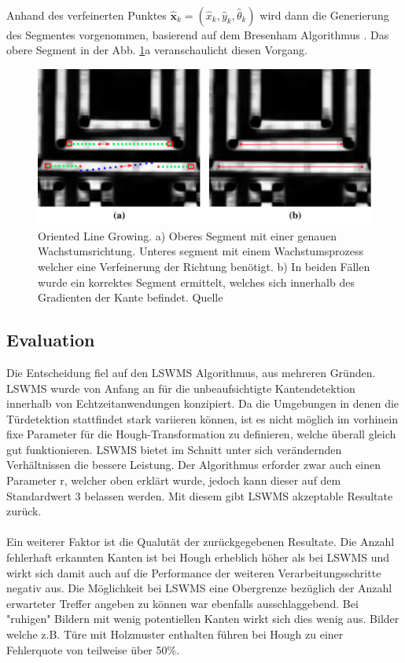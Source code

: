 \paragraph{}
Anhand des verfeinerten Punktes $\hat{\textbf{x}}_k = (\hat{x}_k, \hat{y}_k, \hat{\theta}_k)$ wird dann die Generierung des Segmentes vorgenommen, basierend auf dem Bresenham Algorithmus \cite{bresenham}. Das obere Segment in der Abb. \ref{fig:lswms-line-growing}a veranschaulicht diesen Vorgang.

\begin{figure}[!ht]
\centering
\includegraphics[width=\textwidth]{images/lswms-line-growing} 
\caption{Oriented Line Growing. a) Oberes Segment mit einer genauen Wachstumsrichtung. Unteres segment mit einem Wachstumsprozess welcher eine Verfeinerung der Richtung benötigt. b) In beiden Fällen wurde ein korrektes Segment ermittelt, welches sich innerhalb des Gradienten der Kante befindet. Quelle \cite{nieto}}
\label{fig:lswms-line-growing}
\end{figure}

\subsection{Evaluation}

Die Entscheidung fiel auf den LSWMS Algorithmus, aus mehreren Gründen. LSWMS wurde von Anfang an für die unbeaufsichtigte Kantendetektion innerhalb von Echtzeitanwendungen konzipiert. Da die Umgebungen in denen die Türdetektion stattfindet stark variieren können, ist es nicht möglich im vorhinein fixe Parameter für die Hough-Transformation zu definieren, welche überall gleich gut funktionieren. LSWMS bietet im Schnitt unter sich verändernden Verhältnissen die bessere Leistung. Der Algorithmus erforder zwar auch einen Parameter r, welcher oben erklärt wurde, jedoch kann dieser auf dem Standardwert 3 belassen werden. Mit diesem gibt LSWMS akzeptable Resultate zurück.
\paragraph{}
Ein weiterer Faktor ist die Qualutät der zurückgegebenen Resultate. Die Anzahl fehlerhaft erkannten Kanten ist bei Hough erheblich höher als bei LSWMS und wirkt sich damit auch auf die Performance der weiteren Verarbeitungsschritte negativ aus. Die Möglichkeit bei LSWMS eine Obergrenze bezüglich der Anzahl erwarteter Treffer angeben zu können war ebenfalls ausschlaggebend. Bei "ruhigen" Bildern mit wenig potentiellen Kanten wirkt sich dies wenig aus. Bilder welche z.B. Türe mit Holzmuster enthalten führen bei Hough zu einer Fehlerquote von teilweise über 50\%.
